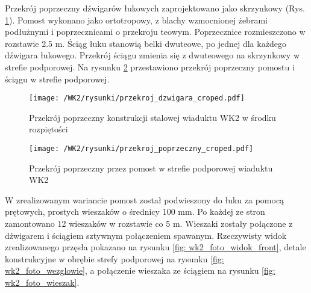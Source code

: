  Przekrój poprzeczny dźwigarów łukowych zaprojektowano jako skrzynkowy (Rys. \ref{fig: wk2_cross_sect}). Pomost wykonano jako ortotropowy, z blachy wzmocnionej żebrami podłużnymi i poprzecznicami o przekroju teowym. Poprzecznice rozmieszczono w rozstawie 2.5 m. Ściąg łuku stanowią belki dwuteowe, po jednej dla każdego dźwigara łukowego. Przekrój ściągu zmienia się z dwuteowego na skrzynkowy w strefie podporowej. Na rysunku \ref{fig: wk2_cross_sect_deck} przestawiono przekrój poprzeczny pomostu i ściągu w strefie podporowej. 
  \begin{figure}[hbt!]
 	\centering
 	\texttt{[image: /WK2/rysunki/przekroj\_dzwigara\_croped.pdf]}
 	\captionsetup{justification=centering}
 	\caption{Przekrój poprzeczny konstrukcji stalowej wiaduktu WK2 w środku rozpiętości}
 	\label{fig: wk2_cross_sect}
 \end{figure}
 \begin{figure}[h]
 	\centering
 	\texttt{[image: /WK2/rysunki/przekroj\_poprzeczny\_croped.pdf]}
 	\captionsetup{justification=centering}
 	\caption{Przekrój poprzeczny przez pomost w strefie podporowej wiaduktu WK2}
 	\label{fig: wk2_cross_sect_deck}
 \end{figure}
 
 W zrealizowanym wariancie pomost został podwieszony do łuku za pomocą prętowych, prostych wieszaków o średnicy 100 mm. Po każdej ze stron zamontowano 12 wieszaków w rozstawie co 5 m. Wieszaki zostały połączone z dźwigarem i ściągiem sztywnym połączeniem spawanym. Rzeczywisty widok zrealizowanego przęsła pokazano na rysunku \ref{fig: wk2_foto_widok_front}, detale konstrukcyjne w obrębie strefy podporowej na rysunku \ref{fig:  wk2_foto_wezglowie}, a połączenie wieszaka ze ściągiem na rysunku \ref{fig: wk2_foto_wieszak}.


